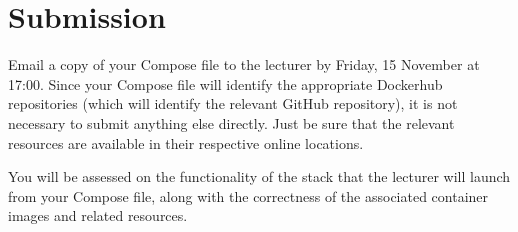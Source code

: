 \documentclass{article}
\begin{document}
\section{Submission}
Email a copy of your Compose file to the lecturer by Friday, 15 November at 17:00.  Since your Compose file will identify the appropriate Dockerhub repositories (which will identify the relevant GitHub repository), it is not necessary to submit anything else directly. Just be sure that the relevant resources are available in their respective online locations.

You will be assessed on the functionality of the stack that the lecturer will launch from your Compose file, along with the correctness of the associated container images and related resources.
\end{document}
